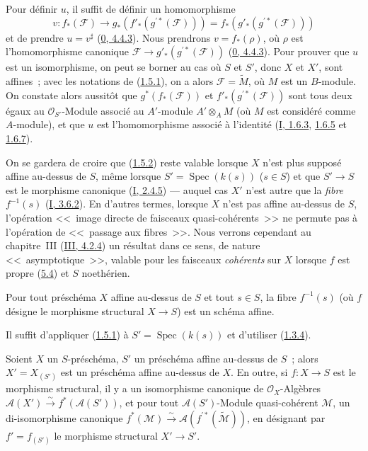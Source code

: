 Pour définir $u$, il suffit de définir un homomorphisme
\[
  v:f_*(\mathcal{F})\longrightarrow
  g_*(f'_*(g^{\prime*}(\mathcal{F})))
  =f_*(g'_*(g^{\prime*}(\mathcal{F})))
\]
et de prendre $u=v^\sharp$ (\hyperref[0.4.4.3-fr]{0, 4.4.3}). Nous prendrons
$v=f_*(\rho)$, où $\rho$ est l'homomorphisme canonique
$\mathcal{F}\to g'_*(g^{\prime*}(\mathcal{F}))$
(\hyperref[0.4.4.3-fr]{0, 4.4.3}). Pour prouver que $u$ est un isomorphisme,
on peut se borner au cas où $S$ et $S'$, donc $X$ et $X'$, sont affines~;
avec les notations de (\hyperref[II.1.5.1-fr]{1.5.1}), on a alors
$\mathcal{F}=\widetilde{M}$, où $M$ est un $B$-module. On constate alors
aussitôt que $g^*(f_*(\mathcal{F}))$ et
$f'_*(g^{\prime*}(\mathcal{F}))$ sont tous deux égaux au
$\mathcal{O}_{S'}$-Module associé au $A'$-module $A'\otimes_A M$ (où $M$ est
considéré comme $A$-module), et que $u$ est l'homomorphisme associé à
l'identité (\hyperref[I.1.6.3-fr]{I, 1.6.3},
\hyperref[I.1.6.5-fr]{1.6.5} et \hyperref[I.1.6.7-fr]{1.6.7}).

\begin{remark}[1.5.3]
\label{II.1.5.3-fr}
On se gardera de croire que (\hyperref[II.1.5.2-fr]{1.5.2}) reste valable
lorsque $X$ n'est plus supposé affine au-dessus de $S$, même lorsque
$S'=\operatorname{Spec}(k(s))$ ($s\in S$) et que $S'\to S$ est le morphisme
canonique (\hyperref[I.2.4.5-fr]{I, 2.4.5}) --- auquel cas $X'$ n'est autre
que la \emph{fibre} $f^{-1}(s)$ (\hyperref[I.3.6.2-fr]{I, 3.6.2}). En
d'autres termes, lorsque $X$ n'est pas affine au-dessus de $S$, l'opération
<<~image directe de faisceaux quasi-cohérents~>> ne permute pas à l'opération
de <<~passage aux fibres~>>. Nous verrons cependant au chapitre~III
(\hyperref[III.4.2.4-fr]{III, 4.2.4}) un résultat dans ce sens, de nature
<<~asymptotique~>>, valable pour les faisceaux \emph{cohérents} sur $X$ lorsque
$f$ est propre (\hyperref[II.5.4-fr]{5.4}) et $S$ noethérien.
\end{remark}

\begin{corollary}[1.5.4]
\label{II.1.5.4-fr}
Pour tout préschéma $X$ affine au-dessus de $S$ et tout $s\in S$, la fibre
$f^{-1}(s)$ (où $f$ désigne le morphisme structural $X\to S$) est un schéma
affine.
\end{corollary}

Il suffit d'appliquer (\hyperref[II.1.5.1-fr]{1.5.1}) à
$S'=\operatorname{Spec}(k(s))$ et d'utiliser
(\hyperref[II.1.3.4-fr]{1.3.4}).

\begin{corollary}[1.5.5]
\label{II.1.5.5-fr}
Soient $X$ un $S$-préschéma, $S'$ un préschéma affine au-dessus de $S$~; alors
$X'=X_{(S')}$ est un préschéma affine au-dessus de $X$. En outre, si
$f:X\to S$ est le morphisme structural, il y a un isomorphisme canonique de
$\mathcal{O}_X$-Algèbres
$\mathcal{A}(X')\xrightarrow{\sim}f^*(\mathcal{A}(S'))$, et pour tout
$\mathcal{A}(S')$-Module quasi-cohérent $\mathcal{M}$, un di-isomorphisme
canonique
$f^*(\mathcal{M})\xrightarrow{\sim}
\mathcal{A}(f^{\prime*}(\widetilde{\mathcal{M}}))$, en désignant par
$f'=f_{(S')}$ le morphisme structural $X'\to S'$.
\end{corollary}

